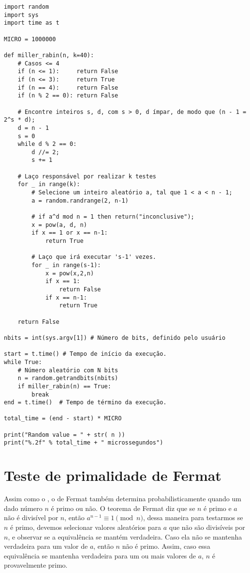\documentclass[
    article,            %
    11pt,               %
    oneside,            %
    a4paper,            %
    english,            %
    brazil,             %
    sumario=tradicional,
    ]{abntex2}
\begin{document}
\begin{lstlisting}[frame=single, title={miller-rabin.py}]
import random 
import sys
import time as t

MICRO = 1000000

def miller_rabin(n, k=40):
    # Casos <= 4
    if (n <= 1):     return False
    if (n <= 3):     return True
    if (n == 4):     return False
    if (n % 2 == 0): return False

    # Encontre inteiros s, d, com s > 0, d ímpar, de modo que (n - 1 = 2^s * d);
    d = n - 1
    s = 0
    while d % 2 == 0:
        d //= 2;
        s += 1     

    # Laço responsável por realizar k testes
    for _ in range(k):
        # Selecione um inteiro aleatório a, tal que 1 < a < n - 1;
        a = random.randrange(2, n-1)

        # if a^d mod n = 1 then return("inconclusive");
        x = pow(a, d, n)
        if x == 1 or x == n-1:
            return True

        # Laço que irá executar 's-1' vezes.
        for _ in range(s-1):
            x = pow(x,2,n)
            if x == 1:
                return False
            if x == n-1:
                return True

    return False

nbits = int(sys.argv[1]) # Número de bits, definido pelo usuário

start = t.time() # Tempo de início da execução.
while True:
    # Número aleatório com N bits
    n = random.getrandbits(nbits) 
    if miller_rabin(n) == True:
        break
end = t.time()  # Tempo de término da execução.

total_time = (end - start) * MICRO

print("Random value = " + str( n ))
print("%.2f" % total_time + " microssegundos")
\end{lstlisting}

\newpage
\section{\textbf{Teste de primalidade de Fermat}}
\label{fermat}

Assim como o , o de Fermat também determina probabilisticamente quando um dado número $n$ é primo ou não. O teorema de Fermat diz que se $n$ é primo e $a$ não é divisível por $n$, então $a^{n-1} \equiv 1 \pmod n$, dessa maneira para testarmos se $n$ é primo, devemos selecionar valores aleatórios para $a$ que não são divisíveis por $n$, e observar se a equivalência se mantém verdadeira. Caso ela não se mantenha verdadeira para um valor de $a$, então $n$ não é primo. Assim, caso essa equivalência se mantenha verdadeira para um ou mais valores de $a$, $n$ é provavelmente primo. 
\end{document}
